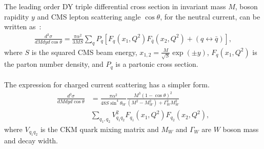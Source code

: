 The leading order DY triple differential cross section in
invariant mass \(M\), boson rapidity \(y\) and CMS
lepton scattering angle \(\cos\theta\), for the neutral current, 
can be written as~\cite{Drell:1970wh,Yamada:1981mw}:
\begin{align}
 \textstyle
 \frac{d^3\sigma}{dM{d}y d\cos\theta} =  
 \frac{\pi\alpha^2}{3MS}\sum_{q}P_q \left[F_q(x_1,Q^2)F_{\bar{q}}(x_2,Q^2) 
 + (q\leftrightarrow\bar{q})\right],
\end{align}
where \(S\) is the squared CMS beam energy, \(x_{1,2} = \frac{M}{\sqrt{S}}\exp(\pm y)\), $F_q(x_1,Q^2)$ 
is the parton number density, and 
$P_q$ is a partonic cross section. 
%
\\
\\
The expression for charged current scattering has a simpler form.
\begin{align}
\frac{d^3\sigma}{dMdyd\cos\theta} &=
 \frac{\pi\alpha^2}{48S\sin^4\theta_W}
 \frac{M^3(1-\cos\theta)^2}{(M^2-M_W^2)+\Gamma_W^2M_W^2}  \nonumber \\
 & \sum_{q_1,q_2}V_{q_1q_2}^2F_{q_1}(x_1,Q^2)F_{q_2}(x_2,Q^2),
\end{align}
where \(V_{q_1q_2}\) is the CKM quark mixing matrix and \(M_W\) and \(\Gamma_W\)
are \(W\) boson mass and decay width.

